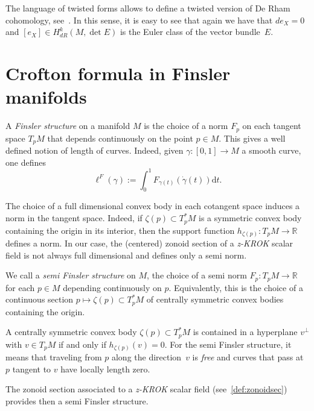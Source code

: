 \documentclass[AHL, Unicode, longabstracts, published]{cedram}
\newcommand{\R}{\mathbb{R}}
\newcommand{\dd}{\mathrm{d}}
\newcommand{\zkrok}{\emph{z-KROK}\xspace}
\begin{document}
\begin{rema}\label{rem:nonorient}
The language of twisted forms allows to define a twisted version of De Rham cohomology, see~\cite{botttu}. In this sense, it is easy to see that again we have that $d e_X=0$ and $[e_X]\in H_{dR}^k(M,\det E)$ is the Euler class of the vector bundle~$E$.
\end{rema}


\section{Crofton formula in Finsler manifolds}\label{sec:Finsler}

A \emph{Finsler structure} on a manifold $M$ is the choice of a norm $F_p$ on each tangent space $T_pM$ that depends continuously on the point $p\in M$. This gives a well defined notion of length of curves. Indeed, given $\gamma:[0,1]\to M$ a smooth curve, one defines
\begin{equation}\label{eq:lengthFinsler}
\ell^F(\gamma):=\int_0^1F_{\gamma(t)}(\dot{\gamma}(t))\dd t.
\end{equation}

The choice of a full dimensional convex body in each cotangent space induces a norm in the tangent space. Indeed, if $\zeta(p)\subset T^*_pM$ is a symmetric convex body containing the origin in its interior, then the support function $h_{\zeta(p)}:T_pM\to \R$ defines a norm. In our case, the (centered) zonoid section of a \zkrok scalar field is not always full dimensional and defines only a semi norm.

\begin{defi}
We call a \emph{semi Finsler structure} on $M$, the choice of a semi norm $F_p:T_pM\to \R$ for each $p\in M$ depending continuously on $p$. Equivalently, this is the choice of a continuous section $p\mapsto \zeta(p)\subset T^*_pM$ of centrally symmetric convex bodies containing the origin.
\end{defi}


\begin{rema}
A centrally symmetric convex body $\zeta(p)\subset T^*_pM$ is contained in a hyperplane $v^\perp$ with $v\in T_pM$ if and only if $h_{\zeta(p)}(v)=0$. For the semi Finsler structure, it means that traveling from $p$ along the direction~$v$ is \emph{free} and curves that pass at $p$ tangent to $v$ have locally length zero.
\end{rema}

The zonoid section associated to a \zkrok scalar field (see~\cref{def:zonoidsec}) provides then a semi Finsler structure.
\end{document}
